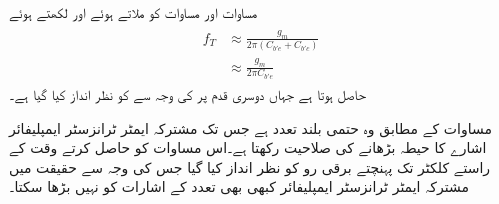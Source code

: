 مساوات  اور مساوات  کو ملاتے ہوئے اور   لکھتے ہوئے
\begin{gather}
\begin{aligned}\label{مساوات_تعددی_ردعمل_کپیسٹر_کا_تخمینہ}
f_T &\approx \frac{g_m}{2 \pi \left(C_{b'e}+C_{b'c} \right)}\\
&\approx \frac{g_m}{2 \pi C_{b'e}}
\end{aligned}
\end{gather}
حاصل ہوتا ہے جہاں دوسری قدم پر   کی وجہ سے  کو نظر انداز کیا گیا ہے۔

مساوات  کے مطابق  وہ حتمی بلند تعدد ہے جس تک مشترکہ ایمٹر    ٹرانزسٹر ایمپلیفائر اشارے کا حیطہ بڑھانے کی صلاحیت رکھتا ہے۔اس مساوات کو حاصل کرتے وقت  کے راستے کلکٹر  تک پہنچتے برقی رو کو نظر انداز کیا گیا جس کی وجہ سے حقیقت میں مشترکہ ایمٹر    ٹرانزسٹر ایمپلیفائر  کبھی بھی  تعدد کے اشارات  کو نہیں بڑھا سکتا۔

